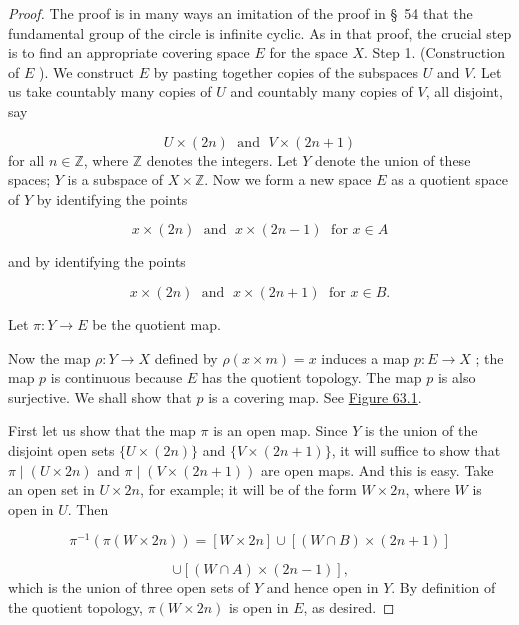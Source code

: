 \begin{proof}
The proof is in many ways an imitation of the proof in \S\ 54 that the fundamental group of the circle is infinite cyclic. As in that proof, the crucial step is to find an appropriate covering space \(E\) for the space \(X\).
Step 1. (Construction of \(E\) ). We construct \(E\) by pasting together copies of the subspaces \(U\) and \(V\). Let us take countably many copies of \(U\) and countably many copies of \(V\), all disjoint, say

\[
U \times ( {2n}) \;\text{ and }\;V \times ( {{2n} + 1})
\]
for all \(n \in \mathbb{Z}\), where \(\mathbb{Z}\) denotes the integers. Let \(Y\) denote the union of these spaces; \(Y\) is a subspace of \(X \times \mathbb{Z}\). Now we form a new space \(E\) as a quotient space of \(Y\) by identifying the points

\[
x \times ( {2n}) \;\text{ and }\;x \times ( {{2n} - 1}) \;\text{ for }x \in A
\]

and by identifying the points

\[
x \times ( {2n}) \;\text{ and }\;x \times ( {{2n} + 1}) \;\text{ for }x \in B.
\]

Let \(\pi : Y \rightarrow E\) be the quotient map.

Now the map \(\rho : Y \rightarrow X\) defined by \(\rho ( {x \times m}) = x\) induces a map \(p : E \rightarrow X\) ; the map \(p\) is continuous because \(E\) has the quotient topology. The map \(p\) is also surjective. We shall show that \(p\) is a covering map. See \hyperref[fig:63.1]{Figure 63.1}.

First let us show that the map \(\pi\) is an open map. Since \(Y\) is the union of the disjoint open sets \(\{ U \times ( {2n}) \}\) and \(\{ V \times ( {{2n} + 1}) \}\), it will suffice to show that \(\pi \mid ( {U \times {2n}})\) and \(\pi \mid ( {V \times ( {{2n} + 1}) })\) are open maps. And this is easy. Take an open set in \(U \times {2n}\), for example; it will be of the form \(W \times {2n}\), where \(W\) is open in \(U\). Then

\[
{\pi }^{-1}( {\pi ( {W \times {2n}}) }) = [ {W \times {2n}}] \cup [ {( {W \cap B}) \times ( {{2n} + 1}) }]
\]

\[
\cup [ {( {W \cap A}) \times ( {{2n} - 1}) }] \text{,}
\]
which is the union of three open sets of \(Y\) and hence open in \(Y\). By definition of the quotient topology, \(\pi ( {W \times {2n}})\) is open in \(E\), as desired.


\end{proof}
